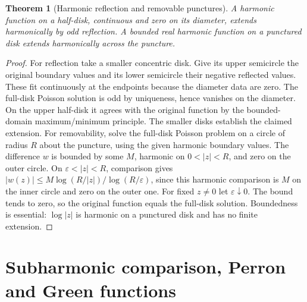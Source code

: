 \documentclass[11pt,a4paper,openany]{book}
\newtheorem{theorem}{Theorem}[chapter]
\theoremstyle{definition}
\theoremstyle{remark}\newtheorem{remark}[theorem]{Remark}
\newcommand{\eps}{\varepsilon}\newcommand{\ee}{\varepsilon}
\newcommand{\family}[1]{}
\begin{document}
\begin{theorem}[Harmonic reflection and removable punctures]\family{D12.13.07}\label{d12:13-07}
A harmonic function on a half-disk, continuous and zero on its diameter, extends harmonically by odd reflection. A bounded real harmonic function on a punctured disk extends harmonically across the puncture.
\end{theorem}
\begin{proof}
For reflection take a smaller concentric disk. Give its upper semicircle the original boundary values and its lower semicircle their negative reflected values. These fit continuously at the endpoints because the diameter data are zero. The full-disk Poisson solution is odd by uniqueness, hence vanishes on the diameter. On the upper half-disk it agrees with the original function by the bounded-domain maximum/minimum principle. The smaller disks establish the claimed extension.
For removability, solve the full-disk Poisson problem on a circle of radius $R$ about the puncture, using the given harmonic boundary values. The difference $w$ is bounded by some $M$, harmonic on $0<|z|<R$, and zero on the outer circle. On $\eps<|z|<R$, comparison gives
$|w(z)|\le M\log(R/|z|)/\log(R/\eps)$, since this harmonic comparison is $M$ on the inner circle and zero on the outer one. For fixed $z\ne0$ let $\eps\downarrow0$. The bound tends to zero, so the original function equals the full-disk solution. Boundedness is essential: $\log|z|$ is harmonic on a punctured disk and has no finite extension.
\end{proof}


\chapter{Subharmonic comparison, Perron and Green functions}\label{ch:d12-14}
\end{document}
